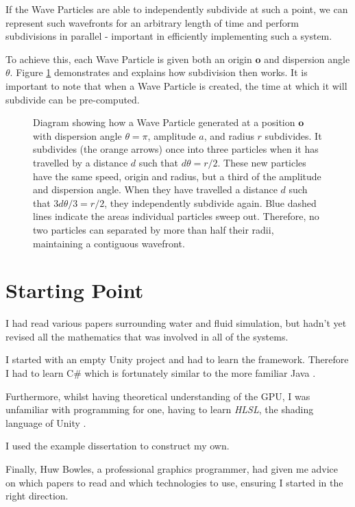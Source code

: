 \documentclass[12pt,a4paper,twoside]{report}
\begin{document}
If the Wave Particles are able to independently subdivide at such a point, we
can represent such wavefronts for an arbitrary length of time and perform
subdivisions in parallel - important in efficiently implementing such a system.

To achieve this, each Wave Particle is given both an origin $\bm{o}$ and
dispersion angle $\theta$. Figure \ref{fig:subdivision_diagram} demonstrates
and explains how subdivision then works. It is important to note that when a
Wave Particle is created, the time at which it will subdivide can be
pre-computed.

\begin{figure}[h]
\def\svgwidth{\linewidth}

\caption{Diagram showing how a Wave Particle generated at a position $\bm{o}$
with dispersion angle $\theta = \pi$, amplitude $a$, and radius $r$ subdivides.
It subdivides (the orange arrows) once into three particles when it has
travelled by a distance $d$ such that $d\theta = r/2$. These new particles have
the same speed, origin and radius, but a third of the amplitude and dispersion
angle. When they have travelled a distance $d$ such that $3d\theta/3=r/2$, they
independently subdivide again. Blue dashed lines indicate the areas individual
particles sweep out. Therefore, no two particles can separated by more than
half their radii, maintaining a contiguous wavefront.}
\label{fig:subdivision_diagram}
\end{figure}

\section{Starting Point}

I had read various papers surrounding water and fluid simulation, but hadn't
yet revised all the mathematics that was involved in all of the systems.

I started with an empty Unity project and had to learn the framework. Therefore
I had to learn C\# which is fortunately similar to the more familiar Java
\cite{UnityScripts}.

Furthermore, whilst having theoretical understanding of the GPU, I was
unfamiliar with programming for one, having to learn \textit{HLSL}, the shading
language of Unity \cite{UnityShaders}.

I used the example dissertation to construct my own.

Finally, Huw Bowles, a professional graphics programmer, had given me advice on
which papers to read and which technologies to use, ensuring I started in the
right direction.
\end{document}
